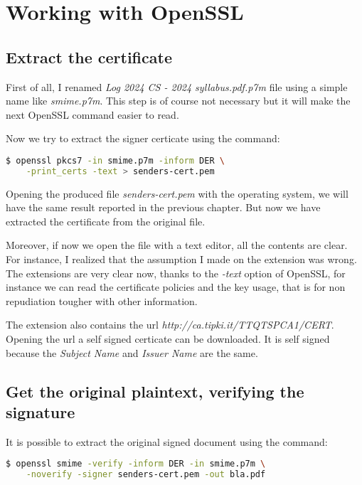 \documentclass{article}
\begin{document}
\section{Working with OpenSSL}

\subsection{Extract the certificate}

First of all, I renamed \emph{Log 2024 CS - 2024 syllabus.pdf.p7m} file using a simple name like \emph{smime.p7m}.
This step is of course not necessary but it will make the next OpenSSL command easier to read.

\noindent Now we try to extract the signer certicate using the command:
\begin{lstlisting}[language=bash]
  $ openssl pkcs7 -in smime.p7m -inform DER \
    -print_certs -text > senders-cert.pem
\end{lstlisting}

Opening the produced file \emph{senders-cert.pem} with the operating system,
we will have the same result reported in the previous chapter.
But now we have extracted the certificate from the original file.

Moreover, if now we open the file with a text editor, all the contents are clear.
For instance, I realized that the assumption I made on the extension was wrong.
The extensions are very clear now, thanks to the \emph{-text} option of OpenSSL,
for instance we can read the certificate policies and the key usage,
that is for non repudiation tougher with other information.

The extension also contains the url 
\emph{http://ca.tipki.it/TTQTSPCA1/CERT}.
Opening the url a self signed certicate can be downloaded.
It is self signed because the \emph{Subject Name} and \emph{Issuer Name} are the same.

\subsection{Get the original plaintext, verifying the signature}

\noindent It is possible to extract the original signed document using the command:
\begin{lstlisting}[language=bash]
  $ openssl smime -verify -inform DER -in smime.p7m \
    -noverify -signer senders-cert.pem -out bla.pdf	
\end{lstlisting}
\end{document}
